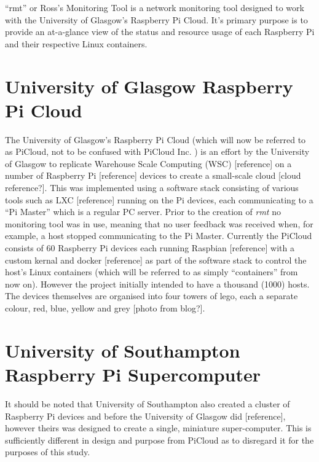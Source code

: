 ``rmt'' or Ross's Monitoring Tool is a network monitoring tool 
designed to work with the University of Glasgow's Raspberry Pi 
Cloud. It's primary purpose is to provide an at-a-glance view of the 
status and resource usage of each Raspberry Pi and their respective 
Linux containers.

\section{University of Glasgow Raspberry Pi Cloud}
\label{intro:picloud}

The University of Glasgow's Raspberry Pi Cloud \citep{glapicloud, picloudblog} (which will now be 
referred to as PiCloud, not to be confused with PiCloud Inc. \citeyearpar{picloudinc}) is an effort by the University of Glasgow to replicate Warehouse Scale Computing (WSC) [reference] on a number of Raspberry Pi [reference] devices to create a small-scale cloud [cloud reference?].
This was implemented using a software stack consisting of various tools such as LXC [reference] running on the Pi devices, each communicating to a ``Pi Master'' which is a regular PC server.
Prior to the creation of \emph{rmt} no monitoring tool was in use, meaning that no user feedback was received when, for example, a host stopped communicating to the Pi Master.
Currently the PiCloud consists of 60 Raspberry Pi devices each running Raspbian [reference] with a custom kernal and docker [reference] as part of the software stack to control the host's Linux containers (which will be referred to as simply ``containers'' from now on).
However the project initially intended to have a thousand (1000) hosts.
The devices themselves are organised into four towers of lego, each a separate colour, red, blue, yellow and grey [photo from blog?].

\section{University of Southampton Raspberry Pi Supercomputer}
\label{intro:pisupercomp}

It should be noted that University of Southampton also created a cluster of Raspberry Pi devices and before the University of Glasgow did [reference], however theirs was designed to create a single, miniature super-computer.
This is sufficiently different in design and purpose from PiCloud as to disregard it for the purposes of this study.
